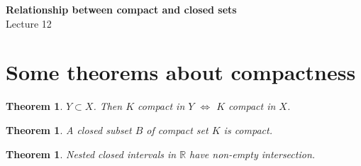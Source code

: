 \documentclass[12pt]{article}
\newcommand{\RR}{\mathbb{R}}   %
\theoremstyle{definition}
\theoremstyle{plain}
\newtheorem{theorem}[definition]{Theorem}
\begin{document}

\begin{center}
    {\Large \textbf{Relationship between compact and closed sets}}\\[0.5em]
    {\large Lecture 12}
\end{center}

\tableofcontents

\newpage

\section{Some theorems about compactness}
\begin{theorem}
$Y \subset X$. Then $K$ compact in $Y$ $\iff$ $K$ compact in $X$.
\end{theorem}

\begin{theorem}
A closed subset $B$ of compact set $K$ is compact.
\end{theorem}

\begin{theorem}
Nested closed intervals in $\RR$ have non-empty intersection.
\end{theorem}
\end{document}
